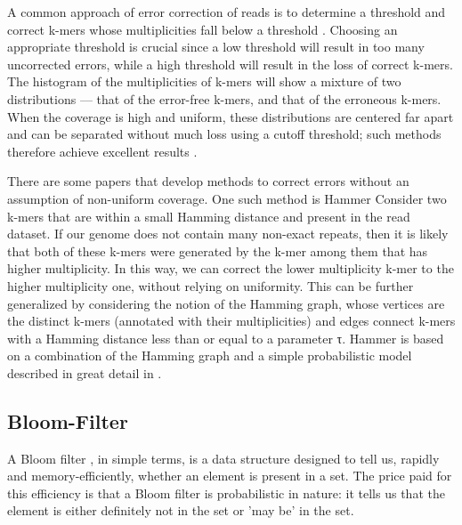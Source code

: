 \documentclass[11pt]{article}
\begin{document}
A common approach of error correction of reads is to determine a threshold and correct k-mers whose multiplicities fall below a threshold \cite{chikhi,quake,musket}. Choosing an appropriate threshold is crucial since a low threshold will result in too many uncorrected errors, while a high threshold will result in the loss of correct k-mers. The histogram of the multiplicities of k-mers will show a mixture of two distributions — that of the error-free k-mers, and that of the erroneous k-mers. When the coverage is high and uniform, these distributions are centered far apart and can be separated without much loss using a cutoff threshold; such methods therefore achieve excellent results \cite{quake}. 

There are some papers that develop methods to correct errors without an assumption of non-uniform coverage. One such method is Hammer \cite{hammer}
Consider two k-mers that are within a small Hamming distance and present in the read dataset. If our genome does not contain many non-exact repeats, then it is likely that both of these k-mers were generated by the k-mer among them that has higher multiplicity. In this way, we can correct the lower multiplicity k-mer to the higher multiplicity one, without relying on uniformity. This can be further generalized by considering the notion of the Hamming graph, whose vertices are the distinct k-mers (annotated with their multiplicities) and edges connect k-mers with a Hamming distance less than or equal to a parameter τ. Hammer is based on a combination of the Hamming graph and a simple probabilistic model described in great detail in \cite{hammer}.

\subsection{Bloom-Filter}
A Bloom filter \cite{bloom}, in simple terms, is a data structure designed to tell us, rapidly and memory-efficiently, whether an element is present in a set. The price paid for this efficiency is that a Bloom filter is probabilistic in nature: it tells us that the element is either definitely not in the set or 'may be' in the set.
\end{document}
